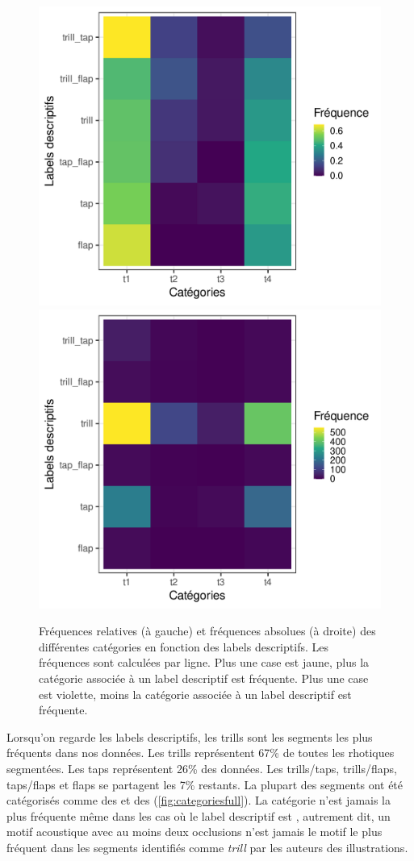 \begin{figure}
	\centering
	\includegraphics[width=0.45\linewidth]{substance/images/categories_full}
	\includegraphics[width=0.45\linewidth]{substance/images/categories_full_freqabs}
	\caption[Fréquences des différentes catégories en fonction des labels descriptifs]{Fréquences relatives (à gauche) et fréquences absolues (à droite) des différentes catégories en fonction des labels descriptifs. Les fréquences sont calculées par ligne. Plus une case est jaune, plus la catégorie associée à un label descriptif est fréquente. Plus une case est violette, moins la catégorie associée à un label descriptif est fréquente.}
	\label{fig:categoriesfull}
\end{figure}

Lorsqu'on regarde les labels descriptifs, les trills sont les segments les plus fréquents dans nos données. Les trills représentent 67\% de toutes les rhotiques segmentées. Les taps représentent 26\% des données. Les trills/taps, trills/flaps, taps/flaps et flaps se partagent les 7\% restants.
La plupart des segments ont été catégorisés comme des  et des  (\autoref{fig:categoriesfull}). La catégorie  n'est jamais la plus fréquente même dans les cas où le label descriptif est , autrement dit, un motif acoustique avec au moins deux occlusions n'est jamais le motif le plus fréquent dans les segments identifiés comme \textit{trill} par les auteurs des illustrations.\\


